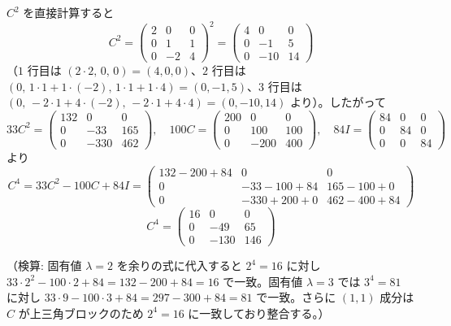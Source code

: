 $C^{2}$ を直接計算すると
\[
C^{2} = \begin{pmatrix} 2 & 0 & 0 \\ 0 & 1 & 1 \\ 0 & -2 & 4 \end{pmatrix}^{2} = \begin{pmatrix} 4 & 0 & 0 \\ 0 & -1 & 5 \\ 0 & -10 & 14 \end{pmatrix}
\]
（$1$ 行目は $(2\cdot2,\,0,\,0)=(4,0,0)$、$2$ 行目は $(0,\,1\cdot1+1\cdot(-2),\,1\cdot1+1\cdot4)=(0,-1,5)$、$3$ 行目は $(0,\,-2\cdot1+4\cdot(-2),\,-2\cdot1+4\cdot4)=(0,-10,14)$ より）。したがって
\[
33C^{2} = \begin{pmatrix} 132 & 0 & 0 \\ 0 & -33 & 165 \\ 0 & -330 & 462 \end{pmatrix}, \quad
100C = \begin{pmatrix} 200 & 0 & 0 \\ 0 & 100 & 100 \\ 0 & -200 & 400 \end{pmatrix}, \quad
84I = \begin{pmatrix} 84 & 0 & 0 \\ 0 & 84 & 0 \\ 0 & 0 & 84 \end{pmatrix}
\]
より
\[
C^{4} = 33C^{2} - 100C + 84I = \begin{pmatrix} 132-200+84 & 0 & 0 \\ 0 & -33-100+84 & 165-100+0 \\ 0 & -330+200+0 & 462-400+84 \end{pmatrix}
\]
\[
\boxed{\; C^{4} = \begin{pmatrix} 16 & 0 & 0 \\ 0 & -49 & 65 \\ 0 & -130 & 146 \end{pmatrix} \;}
\]

（検算: 固有値 $\lambda=2$ を余りの式に代入すると $2^{4}=16$ に対し $33\cdot2^{2}-100\cdot2+84 = 132-200+84=16$ で一致。固有値 $\lambda=3$ では $3^{4}=81$ に対し $33\cdot9-100\cdot3+84=297-300+84=81$ で一致。さらに $(1,1)$ 成分は $C$ が上三角ブロックのため $2^{4}=16$ に一致しており整合する。）
